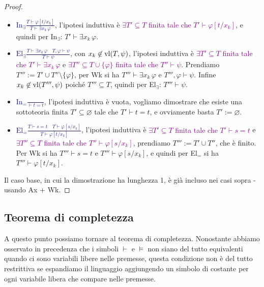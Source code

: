 \begin{proof}
\begin{itemize}
        \item \textcolor{MidnightBlue}{$\displaystyle\text{In}_\exists \frac{T \vdash \varphi[t/x_k]}{T \vdash \exists x_k\,\varphi}$}, l'ipotesi induttiva è \textcolor{purple}{$\exists T' \subseteq T$ finita tale che $T' \vdash \varphi[t/x_k]$}, e quindi per In$_\exists$: $T' \vdash \exists x_k\,\varphi$.
        \item \textcolor{MidnightBlue}{$\displaystyle\text{El}_\exists \frac{T \vdash \exists x_k\,\varphi \quad T,\varphi \vdash \psi}{T \vdash \psi}$}, con $x_k \not\in \operatorname{vl}(T,\psi)$, l'ipotesi induttiva è \textcolor{purple}{$\exists T' \subseteq T$ finita tale che $T' \vdash \exists x_k\,\varphi$} e \textcolor{purple}{$\exists T'' \subseteq T \cup \{\varphi\}$ finita tale che $T'' \vdash \psi$}. Prendiamo $T''' := T' \cup T''\setminus\{\varphi\}$,
        per Wk si ha $T''' \vdash \exists x_k\,\varphi$ e $T''' ,\varphi \vdash \psi$. Infine $x_k \not\in \operatorname{vl}(T''',\psi)$ poiché $T'''\subseteq T$, quindi per El$_\exists$: $T''' \vdash \psi$.
        \item \textcolor{MidnightBlue}{$\displaystyle\text{In}_= \frac{}{\vdash t = t}$}, l'ipotesi induttiva è vuota, vogliamo dimostrare che esiste una sottoteoria finita $T' \subseteq \varnothing$ tale che $T' \vdash t = t$, e ovviamente basta $T' := \varnothing$.
        \item \textcolor{MidnightBlue}{$\displaystyle\text{El}_= \frac{T \vdash s = t \quad T \vdash \varphi[s/x_k]}{T \vdash \varphi[t/x_k]}$}, l'ipotesi induttiva è \textcolor{purple}{$\exists T' \subseteq T$ finita tale che $T' \vdash s = t$} e \textcolor{purple}{$\exists T'' \subseteq T$ finita tale che $T'' \vdash \varphi[s/x_k]$}, prendiamo $T''' := T' \cup T''$, che è finito. Per Wk si ha $T''' \vdash s = t$ e $T''' \vdash \varphi[s/x_k]$, e quindi per El$_=$ si ha $T''' \vdash \varphi[t/x_k]$.
    \end{itemize}
    Il caso base, in cui la dimostrazione ha lunghezza 1, è già incluso nei casi sopra - usando Ax + Wk.
\end{proof}

\subsection{Teorema di completezza}

A questo punto possiamo tornare al teorema di completezza. Nonostante abbiamo osservato in precedenza che i simboli $\vdash$ e $\models$ non siano del tutto equivalenti quando ci sono variabili libere nelle premesse, questa condizione non è del tutto restrittiva se espandiamo il linguaggio aggiungendo un simbolo di costante per ogni variabile libera che compare nelle premesse.

